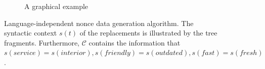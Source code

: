 \begin{figure}[ht]
\begin{subfigure}[]{\textwidth}
{
    }
        \caption{A graphical example}\label{fig:nonce-data-general-algo-example}
    \end{subfigure}
    \caption[Language-independent nonce data generation]{\label{fig:nonce-data-general-algo}Language-independent nonce data generation algorithm. 
    The syntactic context $s(t)$ of the replacements is illustrated by the tree fragments. Furthermore, $\mathcal{C}$ contains the information that $s(service)=s(interior), s(friendly)=s(outdated), s(fast)=s(fresh)$.}
\end{figure}

